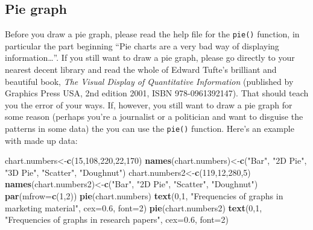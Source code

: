 \documentclass[
]{book}
\newenvironment{Shaded}{\begin{snugshade}}{\end{snugshade}}
\newcommand{\DataTypeTok}[1]{\textcolor[rgb]{0.13,0.29,0.53}{#1}}
\newcommand{\DecValTok}[1]{\textcolor[rgb]{0.00,0.00,0.81}{#1}}
\newcommand{\FloatTok}[1]{\textcolor[rgb]{0.00,0.00,0.81}{#1}}
\newcommand{\KeywordTok}[1]{\textcolor[rgb]{0.13,0.29,0.53}{\textbf{#1}}}
\newcommand{\NormalTok}[1]{#1}
\newcommand{\StringTok}[1]{\textcolor[rgb]{0.31,0.60,0.02}{#1}}
\begin{document}
\hypertarget{pie-graph}{%
\subsection{Pie graph}\label{pie-graph}}

Before you draw a pie graph, please read the help file for the \texttt{pie()} function, in particular the part beginning ``Pie charts are a very bad way of displaying information\ldots{}''. If you still want to draw a pie graph, please go directly to your nearest decent library and read the whole of Edward Tufte's brilliant and beautiful book, \emph{The Visual Display of Quantitative Information} (published by Graphics Press USA, 2nd edition 2001, ISBN 978-0961392147). That should teach you the error of your ways. If, however, you still want to draw a pie graph for some reason (perhaps you're a journalist or a politician and want to disguise the patterns in some data) the you can use the \texttt{pie()} function. Here's an example with made up data:

\begin{Shaded}
\begin{Highlighting}[]
\NormalTok{chart.numbers<-}\KeywordTok{c}\NormalTok{(}\DecValTok{15}\NormalTok{,}\DecValTok{108}\NormalTok{,}\DecValTok{220}\NormalTok{,}\DecValTok{22}\NormalTok{,}\DecValTok{170}\NormalTok{)}
\KeywordTok{names}\NormalTok{(chart.numbers)<-}\KeywordTok{c}\NormalTok{(}\StringTok{"Bar"}\NormalTok{, }\StringTok{"2D Pie"}\NormalTok{, }\StringTok{"3D Pie"}\NormalTok{, }\StringTok{"Scatter"}\NormalTok{, }\StringTok{"Doughnut"}\NormalTok{)}
\NormalTok{chart.numbers2<-}\KeywordTok{c}\NormalTok{(}\DecValTok{119}\NormalTok{,}\DecValTok{12}\NormalTok{,}\DecValTok{280}\NormalTok{,}\DecValTok{5}\NormalTok{)}
\KeywordTok{names}\NormalTok{(chart.numbers2)<-}\KeywordTok{c}\NormalTok{(}\StringTok{"Bar"}\NormalTok{, }\StringTok{"2D Pie"}\NormalTok{, }\StringTok{"Scatter"}\NormalTok{, }\StringTok{"Doughnut"}\NormalTok{)}
\KeywordTok{par}\NormalTok{(}\DataTypeTok{mfrow=}\KeywordTok{c}\NormalTok{(}\DecValTok{1}\NormalTok{,}\DecValTok{2}\NormalTok{))}
\KeywordTok{pie}\NormalTok{(chart.numbers)}
\KeywordTok{text}\NormalTok{(}\DecValTok{0}\NormalTok{,}\DecValTok{1}\NormalTok{, }\StringTok{"Frequencies of graphs in marketing material"}\NormalTok{, }\DataTypeTok{cex=}\FloatTok{0.6}\NormalTok{, }\DataTypeTok{font=}\DecValTok{2}\NormalTok{)}
\KeywordTok{pie}\NormalTok{(chart.numbers2)}
\KeywordTok{text}\NormalTok{(}\DecValTok{0}\NormalTok{,}\DecValTok{1}\NormalTok{, }\StringTok{"Frequencies of graphs in research papers"}\NormalTok{, }\DataTypeTok{cex=}\FloatTok{0.6}\NormalTok{, }\DataTypeTok{font=}\DecValTok{2}\NormalTok{)}
\end{Highlighting}
\end{Shaded}
\end{document}
